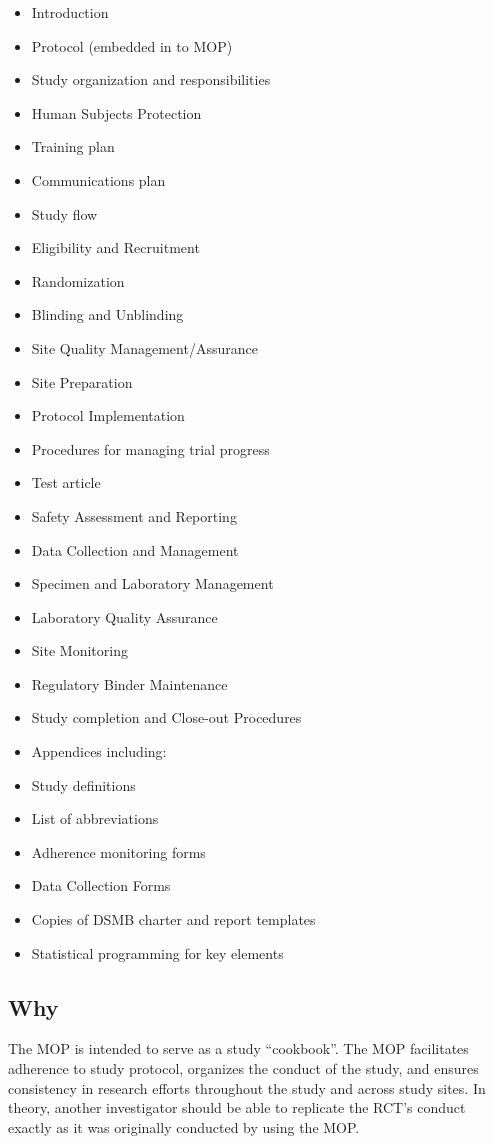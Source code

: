 \documentclass[]{book}
\providecommand{\tightlist}{%
  \setlength{\itemsep}{0pt}\setlength{\parskip}{0pt}}
\theoremstyle{definition}
\theoremstyle{definition}
\theoremstyle{definition}
\theoremstyle{remark}
\begin{document}
\begin{itemize}
\tightlist
\item
  Introduction
\item
  Protocol (embedded in to MOP)
\item
  Study organization and responsibilities
\item
  Human Subjects Protection
\item
  Training plan
\item
  Communications plan
\item
  Study flow
\item
  Eligibility and Recruitment
\item
  Randomization
\item
  Blinding and Unblinding
\item
  Site Quality Management/Assurance
\item
  Site Preparation
\item
  Protocol Implementation
\item
  Procedures for managing trial progress
\item
  Test article
\item
  Safety Assessment and Reporting
\item
  Data Collection and Management
\item
  Specimen and Laboratory Management
\item
  Laboratory Quality Assurance
\item
  Site Monitoring
\item
  Regulatory Binder Maintenance
\item
  Study completion and Close-out Procedures
\item
  Appendices including:
\item
  Study definitions
\item
  List of abbreviations
\item
  Adherence monitoring forms
\item
  Data Collection Forms
\item
  Copies of DSMB charter and report templates
\item
  Statistical programming for key elements
\end{itemize}

\subsection{Why}\label{why-12}

The MOP is intended to serve as a study ``cookbook''. The MOP
facilitates adherence to study protocol, organizes the conduct of the
study, and ensures consistency in research efforts throughout the study
and across study sites. In theory, another investigator should be able
to replicate the RCT's conduct exactly as it was originally conducted by
using the MOP.
\end{document}
